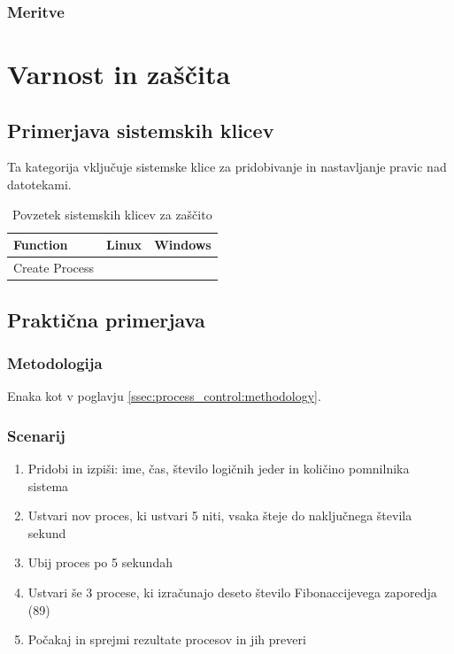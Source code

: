 \documentclass[a4paper,12pt,openright]{book}
\begin{document}
\subsection{Meritve}

\chapter{Varnost in zaščita}

\section{Primerjava sistemskih klicev}

Ta kategorija vključuje sistemske klice za pridobivanje in nastavljanje pravic nad datotekami. \cite{Silberschatz_Galvin_Gagne_2018}

\begin{table}[h!]
	\begin{center}
		\begin{tabular}{ p{3.7cm}|p{2.5cm}|p{6cm} }
			Function       & Linux   & Windows \\
			\hline
			Create Process & \verb|| & \verb|| \\
		\end{tabular}
	\end{center}
	\label{tab:protection}
	\caption{Povzetek sistemskih klicev za zaščito}
\end{table}

\section{Praktična primerjava}

\subsection{Metodologija}

Enaka kot v poglavju \ref{ssec:process_control:methodology}.

\subsection{Scenarij}

\begin{enumerate}
	\item Pridobi in izpiši: ime, čas, število logičnih jeder in količino pomnilnika sistema
	\item Ustvari nov proces, ki ustvari 5 niti, vsaka šteje do naključnega števila sekund
	\item Ubij proces po 5 sekundah
	\item Ustvari še 3 procese, ki izračunajo deseto število Fibonaccijevega zaporedja (89)
	\item Počakaj in sprejmi rezultate procesov in jih preveri
\end{enumerate}
\end{document}
